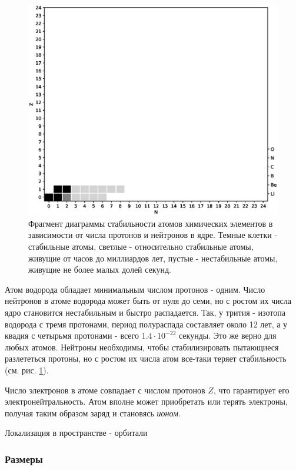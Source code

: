 \begin{figure}[t!]
   \centering
   \includegraphics[scale=0.4]{images/atom_stability}
   \caption{Фрагмент диаграммы стабильности атомов химических элементов в зависимости от числа протонов и нейтронов в ядре. Темные клетки - стабильные атомы, светлые - относительно стабильные атомы, живущие от часов до миллиардов лет, пустые - нестабильные атомы, живущие не более малых долей секунд.}
   \label{fig:atom_stability}
\end{figure}

Атом водорода обладает минимальным числом протонов - одним.
Число нейтронов в атоме водорода может быть от нуля до семи, но с ростом их числа ядро становится нестабильным и быстро распадается.
Так, у трития - изотопа водорода с тремя протонами, период полураспада составляет около 12 лет, а у квадия с четырьмя протонами - всего $1.4\cdot 10^{−22}$ секунды.
Это же верно для любых атомов.
Нейтроны необходимы, чтобы стабилизировать пытающиеся разлететься протоны, но с ростом их числа атом все-таки теряет стабильность (см. рис. \ref{fig:atom_stability}).

Число электронов в атоме совпадает с числом протонов $Z$, что гарантирует его электронейтральность.
Атом вполне может приобретать или терять электроны, получая таким образом заряд и становясь \textit{ионом}.

Локализация в пространстве - орбитали


\subsubsection*{Размеры}

